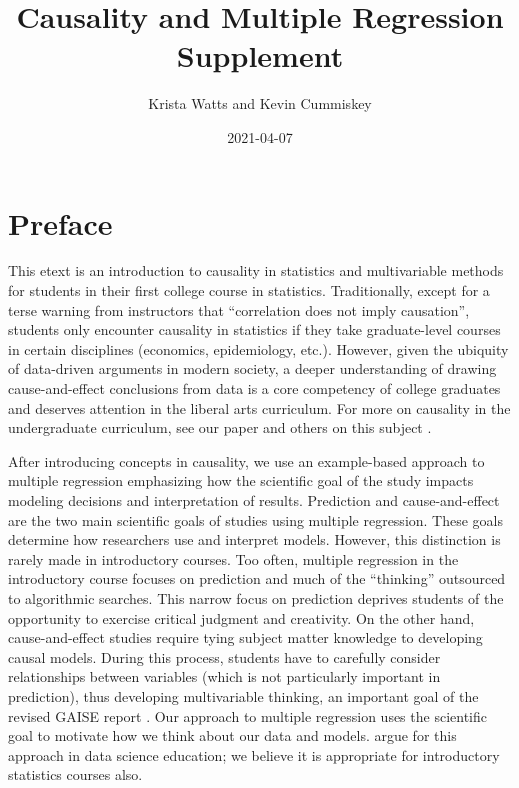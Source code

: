 \documentclass[]{book}
\title{Causality and Multiple Regression Supplement}
\author{Krista Watts and Kevin Cummiskey}
\date{2021-04-07}
\begin{document}
\maketitle

{
\setcounter{tocdepth}{1}
\tableofcontents
}
\hypertarget{preface}{%
\chapter*{Preface}\label{preface}}

This etext is an introduction to causality in statistics and multivariable methods for students in their first college course in statistics. Traditionally, except for a terse warning from instructors that ``correlation does not imply causation'', students only encounter causality in statistics if they take graduate-level courses in certain disciplines (economics, epidemiology, etc.). However, given the ubiquity of data-driven arguments in modern society, a deeper understanding of drawing cause-and-effect conclusions from data is a core competency of college graduates and deserves attention in the liberal arts curriculum. For more on causality in the undergraduate curriculum, see our paper \citep{cummiskey2020causal} and others on this subject \citep{horton2015challenges, kaplan2018teaching, lubke2020we}.

After introducing concepts in causality, we use an example-based approach to multiple regression emphasizing how the scientific goal of the study impacts modeling decisions and interpretation of results. Prediction and cause-and-effect are the two main scientific goals of studies using multiple regression. These goals determine how researchers use and interpret models. However, this distinction is rarely made in introductory courses. Too often, multiple regression in the introductory course focuses on prediction and much of the ``thinking'' outsourced to algorithmic searches. This narrow focus on prediction deprives students of the opportunity to exercise critical judgment and creativity. On the other hand, cause-and-effect studies require tying subject matter knowledge to developing causal models. During this process, students have to carefully consider relationships between variables (which is not particularly important in prediction), thus developing multivariable thinking, an important goal of the revised GAISE report \citep{carver2016guidelines}. Our approach to multiple regression uses the scientific goal to motivate how we think about our data and models. \citet{hernan2019second} argue for this approach in data science education; we believe it is appropriate for introductory statistics courses also.
\end{document}
